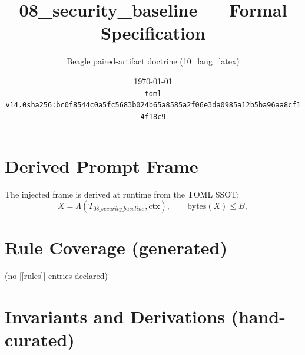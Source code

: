 \documentclass[11pt]{article}
\title{08\_security\_baseline --- Formal Specification}
\author{Beagle paired-artifact doctrine (10\_lang\_latex)}
\date{\today\\ \texttt{toml v14.0\quad sha256:bc0f8544c0a5fc5683b024b65a8585a2f06e3da0985a12b5ba96aa8cf14f18c9}}
\begin{document}
\maketitle

\section{Derived Prompt Frame}
The injected frame is derived at runtime from the TOML SSOT:
\begin{equation}
  X = \Lambda(T_{08\_security\_baseline}, \mathrm{ctx}), \qquad \mathrm{bytes}(X) \le B,
  \label{lbl:derive-frame}
\end{equation}

\section{Rule Coverage (generated)}
(no [[rules]] entries declared)

\section{Invariants and Derivations (hand-curated)}
\end{document}
